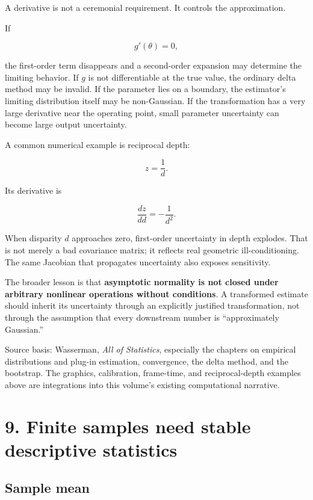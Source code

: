 \hypertarget{02-foundations-ii-ch030-where-the-first-order-delta-method-can-fail}{}

A derivative is not a ceremonial requirement. It controls the approximation.

If

\[
g'(\theta)=0,
\]

the first-order term disappears and a second-order expansion may determine the limiting behavior. If \(g\) is not differentiable at the true value, the ordinary delta method may be invalid. If the parameter lies on a boundary, the estimator's limiting distribution itself may be non-Gaussian. If the transformation has a very large derivative near the operating point, small parameter uncertainty can become large output uncertainty.

A common numerical example is reciprocal depth:

\[
z=\frac1d.
\]

Its derivative is

\[
\frac{dz}{dd}=-\frac1{d^2}.
\]

When disparity \(d\) approaches zero, first-order uncertainty in depth explodes. That is not merely a bad covariance matrix; it reflects real geometric ill-conditioning. The same Jacobian that propagates uncertainty also exposes sensitivity.

The broader lesson is that \textbf{asymptotic normality is not closed under arbitrary nonlinear operations without conditions}. A transformed estimate should inherit its uncertainty through an explicitly justified transformation, not through the assumption that every downstream number is ``approximately Gaussian.''

Source basis: Wasserman, \emph{All of Statistics}, especially the chapters on empirical distributions and plug-in estimation, convergence, the delta method, and the bootstrap. The graphics, calibration, frame-time, and reciprocal-depth examples above are integrations into this volume's existing computational narrative.

\section{9. Finite samples need stable descriptive statistics}\label{02-foundations-ii-ch030-finite-samples-need-stable-descriptive-statistics}

\hypertarget{02-foundations-ii-ch030-finite-samples-need-stable-descriptive-statistics}{}

\subsection{Sample mean}\label{02-foundations-ii-ch030-sample-mean}

